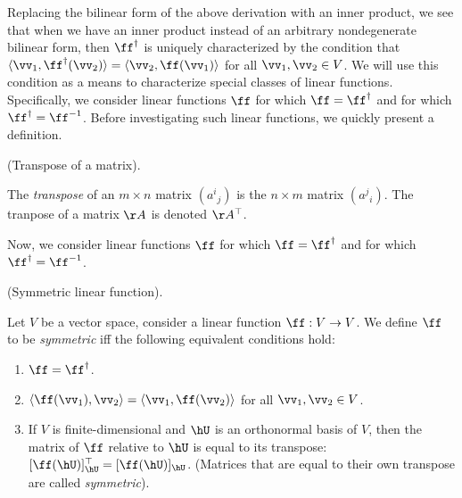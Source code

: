 Replacing the bilinear form of the above derivation with an inner product, we see that when we have an inner product instead of an arbitrary nondegenerate bilinear form, then $\ff^\dag$ is uniquely characterized by the condition that $\langle \vv_1, \ff^\dag(\vv_2) \rangle = \langle \vv_2, \ff(\vv_1) \rangle$ for all $\vv_1, \vv_2 \in V$. We will use this condition as a means to characterize special classes of linear functions. Specifically, we consider linear functions $\ff$ for which $\ff = \ff^\dag$ and for which $\ff^\dag = \ff^{-1}$. Before investigating such linear functions, we quickly present a definition.

\begin{defn}
    (Transpose of a matrix).
    
    The \textit{transpose} of an $m \times n$ matrix $(a^i{}_j)$ is the $n \times m$ matrix $(a^j{}_i)$. The tranpose of a matrix $\AA$ is denoted $\AA^\top$.
\end{defn}

Now, we consider linear functions $\ff$ for which $\ff = \ff^\dag$ and for which $\ff^\dag = \ff^{-1}$.

\begin{defn} 
\label{ch::bilinear_forms_metric_tensors::defn::symmetric_linear_fn}
    (Symmetric linear function).

    Let $V$ be a vector space, consider a linear function $\ff:V \rightarrow V$. We define $\ff$ to be \textit{symmetric} iff the following equivalent conditions hold:
    
    \begin{enumerate}
        \item $\ff = \ff^\dag$.
        \item $\langle \ff(\vv_1), \vv_2 \rangle = \langle \vv_1, \ff(\vv_2) \rangle$ for all $\vv_1, \vv_2 \in V$.
        \item If $V$ is finite-dimensional and $\hU$ is an orthonormal basis of $V$, then the matrix of $\ff$ relative to $\hU$ is equal to its transpose: $[\ff(\hU)]_{\hU}^\top = [\ff(\hU)]_{\hU}$. (Matrices that are equal to their own transpose are called \textit{symmetric}).
    \end{enumerate}
\end{defn}
        
